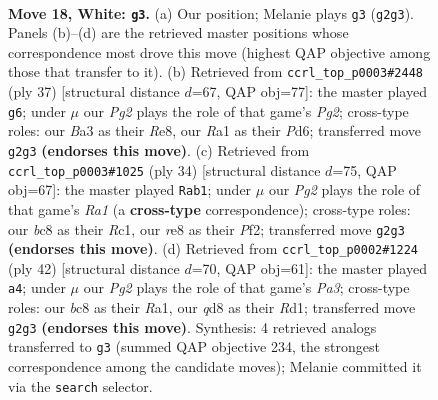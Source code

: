 \documentclass[11pt]{article}
\begin{document}
\clearpage

\begin{figure}[p]\centering
\begin{subfigure}{0.46\textwidth}\centering
\resizebox{\linewidth}{!}{%
\newchessgame
\chessboard[
  setfen={rnbqr1k1/5p2/1p2pnp1/7p/p2P4/B1PB1N1P/PQ3PP1/R3R1K1 w - - 4 18},
  showmover=false,
  pgfstyle=straightmove, color=movearrow, markmove={g2-g3}
]}
\caption{}
\end{subfigure}\hfill
\begin{subfigure}{0.46\textwidth}\centering
\resizebox{\linewidth}{!}{%
\newchessgame
\chessboard[
  setfen={r3r1k1/1ppbqpp1/p2p1n1p/3P4/3NP3/1P2R1NP/1P3PP1/R2Q2K1 b - - 6 19},
  showmover=false,
  pgfstyle=straightmove, color=movearrow, markmove={g7-g6}
]}
\caption{}
\end{subfigure}
\\[4pt]
\begin{subfigure}{0.46\textwidth}\centering
\resizebox{\linewidth}{!}{%
\newchessgame
\chessboard[
  setfen={r3r1k1/1bqn1pp1/pp2p2p/7n/3P3B/2PBQN2/P4PPP/R1R3K1 w - - 4 18},
  showmover=false,
  pgfstyle=straightmove, color=movearrow, markmove={a1-b1}
]}
\caption{}
\end{subfigure}\hfill
\begin{subfigure}{0.46\textwidth}\centering
\resizebox{\linewidth}{!}{%
\newchessgame
\chessboard[
  setfen={2r3k1/pb2qp2/1pnr3p/3p2p1/8/P1P1PN1P/2Q2PP1/R2R1BK1 w - - 1 22},
  showmover=false,
  pgfstyle=straightmove, color=movearrow, markmove={a3-a4}
]}
\caption{}
\end{subfigure}
\caption{\textbf{Move 18, White: \texttt{g3}.} (a) Our position; Melanie plays \texttt{g3} (\texttt{g2g3}). Panels (b)--(d) are the retrieved master positions whose correspondence most drove this move (highest QAP objective among those that transfer to it). (b) Retrieved from \texttt{ccrl\_top\_p0003\#2448} (ply 37) [structural distance $d$=67, QAP obj=77]: the master played \texttt{g6}; under $\mu$ our \emph{Pg2} plays the role of that game's \emph{Pg2}; cross-type roles: our \emph{B}a3 as their \emph{R}e8, our \emph{R}a1 as their \emph{P}d6; transferred move \texttt{g2g3} \textbf{(endorses this move)}. (c) Retrieved from \texttt{ccrl\_top\_p0003\#1025} (ply 34) [structural distance $d$=75, QAP obj=67]: the master played \texttt{Rab1}; under $\mu$ our \emph{Pg2} plays the role of that game's \emph{Ra1} (a \textbf{cross-type} correspondence); cross-type roles: our \emph{b}c8 as their \emph{R}c1, our \emph{r}e8 as their \emph{P}f2; transferred move \texttt{g2g3} \textbf{(endorses this move)}. (d) Retrieved from \texttt{ccrl\_top\_p0002\#1224} (ply 42) [structural distance $d$=70, QAP obj=61]: the master played \texttt{a4}; under $\mu$ our \emph{Pg2} plays the role of that game's \emph{Pa3}; cross-type roles: our \emph{b}c8 as their \emph{R}a1, our \emph{q}d8 as their \emph{R}d1; transferred move \texttt{g2g3} \textbf{(endorses this move)}. Synthesis: 4 retrieved analogs transferred to \texttt{g3} (summed QAP objective 234, the strongest correspondence among the candidate moves); Melanie committed it via the \texttt{search} selector.}
\label{fig:thought-m34}
\end{figure}
\end{document}
